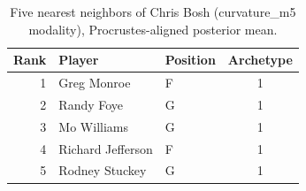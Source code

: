 \begin{table}[htbp]
  \centering\small
  \begin{tabular}{rllc}
    \toprule
    Rank & Player & Position & Archetype \\
    \midrule
    1 & Greg Monroe & F & 1 \\
    2 & Randy Foye & G & 1 \\
    3 & Mo Williams & G & 1 \\
    4 & Richard Jefferson & F & 1 \\
    5 & Rodney Stuckey & G & 1 \\
    \bottomrule
  \end{tabular}
  \caption{Five nearest neighbors of Chris Bosh (curvature_m5 modality), Procrustes-aligned posterior mean.}
  \label{tab:Chris_Bosh_neighbors_curvature_m5}
\end{table}

